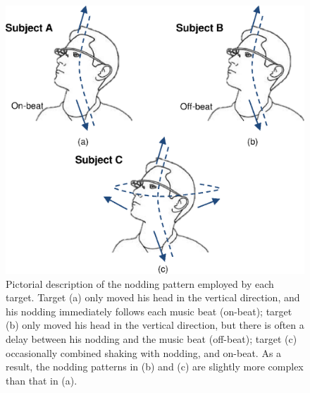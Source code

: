 \begin{figure}
\vspace{-1mm}
\centering

\includegraphics[width = .85\columnwidth]{figure/imitation_subject_movement.eps}

\caption{\label{fig:imitation_movement} Pictorial description of the nodding pattern employed by each target. Target (a) only moved his head in the vertical direction, and his nodding immediately follows each music beat (on-beat); target (b) only moved his head in the vertical direction, but there is often a delay between his nodding and the music beat (off-beat); target (c) occasionally combined shaking with nodding, and on-beat. As a result, the nodding patterns in (b) and (c) are slightly more complex than that in (a). }
\vspace{-1mm}
\end{figure}

 